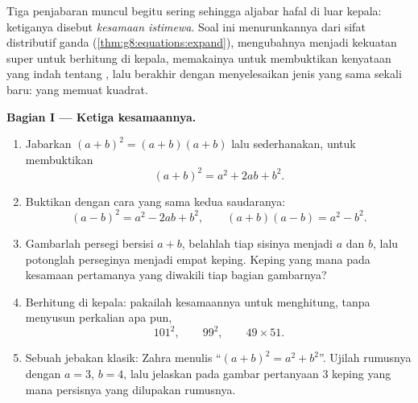 \begin{problem}[{Soal akhir pekan --- $(a+b)^2$, $(a-b)^2$,
$(a+b)(a-b)$, dan jumlah $1 + 3 + 5 + \dots + (2n-1) = n^2$}]
\label{pb:g8:equations:1}
Tiga penjabaran muncul begitu sering sehingga aljabar hafal di
luar kepala: ketiganya disebut \emph{kesamaan istimewa}. Soal ini
menurunkannya dari sifat distributif ganda
(\cref{thm:g8:equations:expand}), mengubahnya menjadi kekuatan super
untuk berhitung di kepala, memakainya untuk membuktikan kenyataan
yang indah tentang , lalu berakhir dengan
menyelesaikan  jenis yang sama sekali baru:  yang
memuat kuadrat.

\medskip
\noindent\textbf{Bagian I --- Ketiga kesamaannya.}
\begin{enumerate}
  \item Jabarkan $(a + b)^2 = (a + b)(a + b)$ lalu sederhanakan, untuk membuktikan
        \[
        (a + b)^2 = a^2 + 2ab + b^2 .
        \]
  \item Buktikan dengan cara yang sama kedua saudaranya:
        \[
        (a - b)^2 = a^2 - 2ab + b^2,
        \qquad
        (a + b)(a - b) = a^2 - b^2 .
        \]
  \item Gambarlah persegi bersisi $a + b$, belahlah tiap sisinya
        menjadi $a$ dan $b$, lalu potonglah perseginya menjadi empat
        keping. Keping yang mana pada kesamaan pertamanya yang
        diwakili tiap bagian gambarnya?
  \item Berhitung di kepala: pakailah kesamaannya untuk menghitung,
        tanpa menyusun perkalian apa pun,
        \[
        101^2, \qquad 99^2, \qquad 49 \times 51 .
        \]
  \item Sebuah jebakan klasik: Zahra menulis ``$(a + b)^2 = a^2 + b^2$''.
        Ujilah rumusnya dengan $a = 3$, $b = 4$, lalu jelaskan pada
        gambar pertanyaan 3 keping yang mana persisnya yang
        dilupakan rumusnya.
\end{enumerate}


\end{problem}
